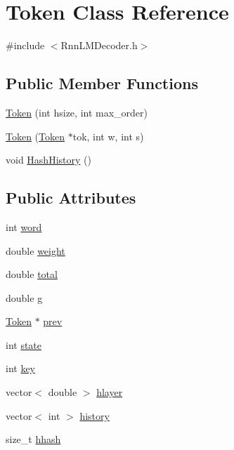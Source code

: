 \hypertarget{class_token}{}\section{Token Class Reference}
\label{class_token}


{\ttfamily \#include $<$Rnn\+L\+M\+Decoder.\+h$>$}

\subsection*{Public Member Functions}
\begin{DoxyCompactItemize}
\item 
\hyperlink{class_token_aa9cfde8aab525203d9e64a059e66d73c}{Token} (int hsize, int max\+\_\+order)
\item 
\hyperlink{class_token_a8e424d6974e9ad56b81371139875e706}{Token} (\hyperlink{class_token}{Token} $\ast$tok, int w, int s)
\item 
void \hyperlink{class_token_a0474a8cfd1857b5b3dc828e090490858}{Hash\+History} ()
\end{DoxyCompactItemize}
\subsection*{Public Attributes}
\begin{DoxyCompactItemize}
\item 
int \hyperlink{class_token_a4b4d79b1fee628f9c1196b21af3a3db1}{word}
\item 
double \hyperlink{class_token_ae1b01f3086ba1fba7525f4a6e14985c4}{weight}
\item 
double \hyperlink{class_token_a7defe8a70425877b199e9b6db3c3d3cd}{total}
\item 
double \hyperlink{class_token_aefe98e370e2a74e665b7eee5cdd5b206}{g}
\item 
\hyperlink{class_token}{Token} $\ast$ \hyperlink{class_token_a816e682effa4d369c3ab17e77d8ce3e2}{prev}
\item 
int \hyperlink{class_token_ac90523529338b2dfc3f0ced3f10c7e55}{state}
\item 
int \hyperlink{class_token_ad0913b74b0ae9efb9eee1cc006eb43c6}{key}
\item 
vector$<$ double $>$ \hyperlink{class_token_a55d0874ef8b2bf1495d09a39307bdee7}{hlayer}
\item 
vector$<$ int $>$ \hyperlink{class_token_ad9fb3d0ddce5c54b08b8b33993b6b0b2}{history}
\item 
size\+\_\+t \hyperlink{class_token_ad28d056c202b47652fae3020c49bef19}{hhash}
\end{DoxyCompactItemize}



